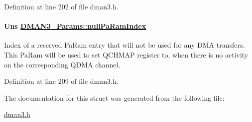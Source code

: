 Definition at line 202 of file dman3.h.\hypertarget{struct_d_m_a_n3___params_35fa90f301f8b215cb385a78d4fb215d}{
\paragraph[nullPaRamIndex]{\setlength{\rightskip}{0pt plus 5cm}Uns \hyperlink{struct_d_m_a_n3___params_35fa90f301f8b215cb385a78d4fb215d}{DMAN3\_\-Params::null\-Pa\-Ram\-Index}}\hfill}
\label{struct_d_m_a_n3___params_35fa90f301f8b215cb385a78d4fb215d}


Index of a reserved Pa\-Ram entry that will not be used for any DMA transfers. This Pa\-Ram will be used to set QCHMAP register to, when there is no activity on the corresponding QDMA channel. 

Definition at line 209 of file dman3.h.

The documentation for this struct was generated from the following file:\begin{CompactItemize}
\item 
\hyperlink{dman3_8h}{dman3.h}\end{CompactItemize}
